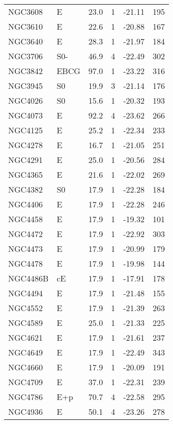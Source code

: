\begin{tabular}{llrccr}
NGC3608        & E      &  23.0 & 1 &  -21.11 & 195\\
NGC3610        & E      &  22.6 & 1 &  -20.88 & 167\\
NGC3640        & E      &  28.3 & 1 &  -21.97 & 184\\
NGC3706        & S0-    &  46.9 & 4 &  -22.49 & 302\\
NGC3842        & EBCG   &  97.0 & 1 &  -23.22 & 316\\
NGC3945        & S0     &  19.9 & 3 &  -21.14 & 176\\
NGC4026        & S0     &  15.6 & 1 &  -20.32 & 193\\
NGC4073        & E      &  92.2 & 4 &  -23.62 & 266\\
NGC4125        & E      &  25.2 & 1 &  -22.34 & 233\\
NGC4278        & E      &  16.7 & 1 &  -21.05 & 251\\
NGC4291        & E      &  25.0 & 1 &  -20.56 & 284\\
NGC4365        & E      &  21.6 & 1 &  -22.02 & 269\\
NGC4382        & S0     &  17.9 & 1 &  -22.28 & 184\\
NGC4406        & E      &  17.9 & 1 &  -22.28 & 246\\
NGC4458        & E      &  17.9 & 1 &  -19.32 & 101\\
NGC4472        & E      &  17.9 & 1 &  -22.92 & 303\\
NGC4473        & E      &  17.9 & 1 &  -20.99 & 179\\
NGC4478        & E      &  17.9 & 1 &  -19.98 & 144\\
NGC4486B       & cE     &  17.9 & 1 &  -17.91 & 178\\
NGC4494        & E      &  17.9 & 1 &  -21.48 & 155\\
NGC4552        & E      &  17.9 & 1 &  -21.39 & 263\\
NGC4589        & E      &  25.0 & 1 &  -21.33 & 225\\
NGC4621        & E      &  17.9 & 1 &  -21.61 & 237\\
NGC4649        & E      &  17.9 & 1 &  -22.49 & 343\\
NGC4660        & E      &  17.9 & 1 &  -20.09 & 191\\
NGC4709        & E      &  37.0 & 1 &  -22.31 & 239\\
NGC4786        & E+p    &  70.7 & 4 &  -22.58 & 295\\
NGC4936        & E      &  50.1 & 4 &  -23.26 & 278\\

\end{tabular}
